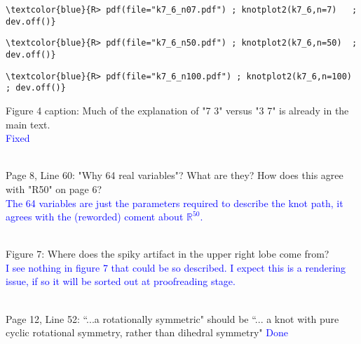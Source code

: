 \documentclass[12pt]{article}
\begin{document}
\begin{Verbatim}[commandchars=\\\{\}]
\textcolor{blue}{R> pdf(file="k7_6_n07.pdf") ; knotplot2(k7_6,n=7)   ; dev.off()}
\end{Verbatim}
\begin{Verbatim}[commandchars=\\\{\}]
\textcolor{blue}{R> pdf(file="k7_6_n50.pdf") ; knotplot2(k7_6,n=50)  ; dev.off()}
\end{Verbatim}
\begin{Verbatim}[commandchars=\\\{\}]
\textcolor{blue}{R> pdf(file="k7_6_n100.pdf") ; knotplot2(k7_6,n=100) ; dev.off()}
\end{Verbatim}


Figure 4 caption: Much of the explanation of "7 3" versus "3 7" is
already in the main text.  \textcolor{blue}{\\Fixed\\ \\}


Page 8, Line 60: "Why 64 real variables"?  What are they?  How does
this agree with "R50" on page 6?\textcolor{blue}{\\ The 64 variables are just the parameters required to describe the knot path, it agrees with the (reworded) coment about $\mathbb{R}^{50}$.\\ \\}



Figure 7: Where does the spiky artifact in the upper right lobe come
from?  \textcolor{blue}{\\I see nothing in figure 7 that could be so
  described.  I expect this is a rendering issue, if so it will be
  sorted out at proofreading stage.\\ \\}


Page 12, Line 52: ``...a rotationally symmetric" should be ``... a knot with
pure cyclic rotational symmetry, rather than dihedral symmetry"
  \textcolor{blue}{Done\\ \\}
\end{document}
